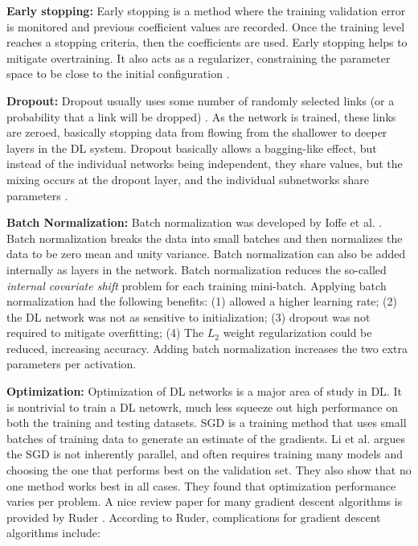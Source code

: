 \documentclass[12pt]{spieman}
\begin{document}
\begin{spacing}{1}
\textbf{Early stopping:} Early stopping is a method where the training validation error is monitored and previous coefficient values are recorded. Once the training level reaches a stopping criteria, then the coefficients are used. Early stopping helps to mitigate overtraining. It also acts as a regularizer, constraining the parameter space to be close to the initial configuration \cite{Erhan2010} .

\textbf{Dropout:} Dropout usually uses some number of randomly selected links (or a probability that a link will be dropped) \cite{Srivastava2014Dropout} . As the network is trained, these links are zeroed, basically stopping data from flowing from the shallower to deeper layers in the DL system. Dropout basically allows a bagging-like effect, but instead of the individual networks being independent, they share values, but the mixing occurs at the dropout layer, and the individual subnetworks share parameters \cite{goodfellow2016deep} .

\textbf{Batch Normalization:} Batch normalization was developed by Ioffe et al. \cite{ioffe2015batch}. Batch normalization breaks the data into small batches and then normalizes the data to be zero mean and unity variance. Batch normalization can also be added internally as layers in the network. Batch normalization reduces the so-called \textit{internal covariate shift} problem for each training mini-batch. Applying batch normalization had the following benefits: (1) allowed a higher learning rate; (2) the DL network was not as sensitive to initialization; (3) dropout was not required to mitigate overfitting; (4) The $L_{2}$ weight regularization could be reduced, increasing accuracy. Adding batch normalization increases the two extra parameters per activation.

\textbf{Optimization:} Optimization of DL networks is a major area of study in DL. It is nontrivial to train a DL netowrk, much less squeeze out high performance on both the training and testing datasets. SGD is a training method that uses small batches of training data to generate an estimate of the gradients. Li et al. \cite{Le2011Optimization} argues the SGD is not inherently parallel, and often requires training many models and choosing the one that performs best on the validation set. They also show that no one method works best in all cases. They found that optimization performance varies per problem. A nice review paper for many gradient descent algorithms is provided by Ruder \cite{ruder2016overview} . According to Ruder, complications for gradient descent algorithms include:


\end{spacing}
\end{document}
